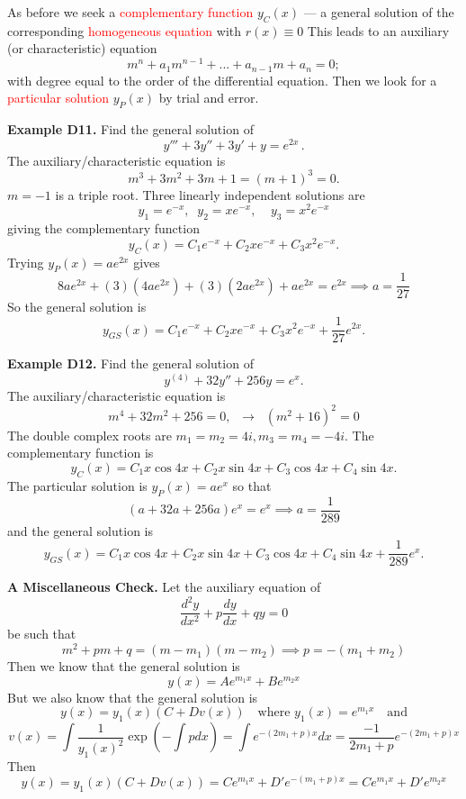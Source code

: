 \documentclass{article}
\begin{document}
As before we seek a \textcolor{red}{complementary function} $y_{C} (x)$ --- a general solution of the corresponding \textcolor{red}{homogeneous equation} with $r (x) \equiv 0$
This leads to an auxiliary (or characteristic) equation
$$
m^n+ a_1 m^{n-1} +...+ a_{n-1} m+ a_n =0;
$$
with degree equal to the order of the differential equation. Then we look for a \textcolor{red}{particular solution} $y_P (x)$ by trial and error.

\hrulefill

\textbf{Example D11.} Find the general solution of
{\small
$$
y'''+ 3y''+ 3 y' +y=e^{2x}\,.
$$
}
The auxiliary/characteristic equation is
{\small 
$$
m^3 + 3 m^2 + 3m +1=(m+1)^3=0.
$$
}
$m=-1$ is a triple root. Three linearly independent solutions are
{\small
$$
y_1= e^{-x}, \;\; y_2= x e^{-x}, \;\; \;\; y_3= x^2 e^{-x}
$$
}
giving the complementary function
{\small 
$$
y_C(x)= C_1 e^{-x} +C_2 x e^{-x} +C_3 x^2 e^{-x}.
$$
}
Trying $y_P (x) = a e^{2x}$ gives
{\small
$$
8a e^{2x} + (3)(4a e^{2x}) + (3)(2 a e^{2x}) + a e^{2x} = e^{2x} \implies a = \frac{1}{27}
$$
}
So the general solution is
{\small
$$
y_{GS}(x)= C_1 e^{-x} +C_2 x e^{-x} +C_3 x^2 e^{-x} + \frac{1}{27} e^{2x}. 
$$
}

\hrulefill

\textbf{Example D12.} Find the general solution of
$$
y^{(4)}+32y''+256y=e^{x}.
$$
The auxiliary/characteristic equation is
$$
m^4+ 32 m^2 +256=0, \;\;  \to \;\; (m^2+16)^2=0
$$
The double complex roots are $ m_1= m_2 = 4i, m_3 = m_4= -4i.$ The complementary function is
$$
y_C(x) =C_1 x \cos 4 x + C_2 x \sin 4 x + C_3 \cos 4 x + C_4 \sin 4 x.
$$
The particular solution is $y_P (x) = a e^x$ so that
$$
\left(a + 32 a + 256 a\right) e^x = e^x \implies a = \frac{1}{289}
$$
and the general solution is
$$
y_{GS} (x) = C_1 x \cos 4 x + C_2 x \sin 4 x + C_3 \cos 4 x + C_4 \sin 4 x + \frac{1}{289} e^x.
$$

\hrulefill

\textbf{A Miscellaneous Check.} Let the auxiliary equation of
$$
\frac{d^2 y}{dx^2} + p \frac{dy}{dx} + q  y = 0
$$
be such that
$$
m^2 + p m + q = (m-m_1)(m-m_2) \implies p = -(m_1 + m_2)
$$
Then we know that the general solution is
$$
y(x) = A e^{m_1 x} + B e^{m_2 x}
$$
But we also know that the general solution is
{\small 
$$
y(x) = y_1 (x) (C + D v(x)) \quad \mbox{where  } y_1 (x) = e^{m_1 x} \quad \mbox{and}
$$
}
{\small 
$$
v(x) = \int \frac{1}{y_1(x)^2} \exp \left(-\int p dx\right) = \int e^{-(2m_1 + p) x} dx = \frac{-1}{2m_1 + p} e^{-(2m_1 + p) x}
$$
}
Then
{\small
$$
y(x) = y_1 (x) (C + D v(x)) = C e^{m_1 x} + D' e^{-(m_1 + p)x} = C e^{m_1 x} + D' e^{m_2 x}
$$
}
\end{document}
